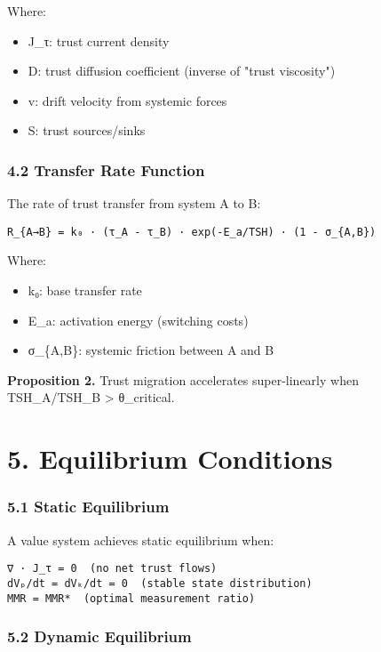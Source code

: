 \documentclass[11pt,oneside]{book}
\begin{document}
Where:
\begin{itemize}
\item J\_τ: trust current density
\item D: trust diffusion coefficient (inverse of "trust viscosity")
\item v: drift velocity from systemic forces
\item S: trust sources/sinks
\end{itemize}

\subsubsection{4.2 Transfer Rate Function}

The rate of trust transfer from system A to B:

\begin{verbatim}
R_{A→B} = k₀ · (τ_A - τ_B) · exp(-E_a/TSH) · (1 - σ_{A,B})
\end{verbatim}

Where:
\begin{itemize}
\item k₀: base transfer rate
\item E\_a: activation energy (switching costs)
\item σ\_\{A,B\}: systemic friction between A and B
\end{itemize}

\textbf{Proposition 2.} Trust migration accelerates super-linearly when TSH_A/TSH_B > θ_critical.

\section{5. Equilibrium Conditions}

\subsubsection{5.1 Static Equilibrium}

A value system achieves static equilibrium when:

\begin{verbatim}
∇ · J_τ = 0  (no net trust flows)
dVₚ/dt = dVₖ/dt = 0  (stable state distribution)
MMR = MMR*  (optimal measurement ratio)
\end{verbatim}

\subsubsection{5.2 Dynamic Equilibrium}
\end{document}
